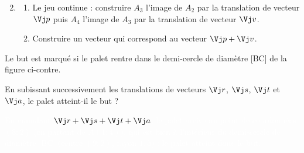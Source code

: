 \documentclass[a4paper,11pt,french]{report}
\begin{document}
\begin{ActiviteBox}
\begin{enumerate}
\setcounter{enumi}{1}
\item
\begin{enumerate}
\item Le jeu continue : construire $A_3$ l'image de $A_2$ par la translation de vecteur $\Vj p$ puis $A_4$ l'image de $A_3$ par la translation de vecteur $\Vj v$.
\item Construire un vecteur qui correspond au vecteur $\Vj p+\Vj v$.
\end{enumerate}
\end{enumerate}

\bigskip

\PALP\quad Le but est marqué si le palet rentre dans le demi-cercle de diamètre [BC] de la figure ci-contre.

En subissant successivement les translations de vecteurs $\Vj r$, $\Vj s$, $\Vj t$ et $\Vj a$, le palet atteint-il le but ?

\begin{center}
\end{center}

\medskip
\textcolor{white}{En cumulant $\Vj r+\Vj s+\Vj t+\Vj a$, le palet arrive au point de coordonnées $(8;2)$ (en partant de $A(1;4)$), qui est bien à l'intérieur du demi-cercle de diamètre [BC] (centre $(9;2)$, rayon $1,5$) : le palet atteint donc le but.}

\end{ActiviteBox}
\end{document}
